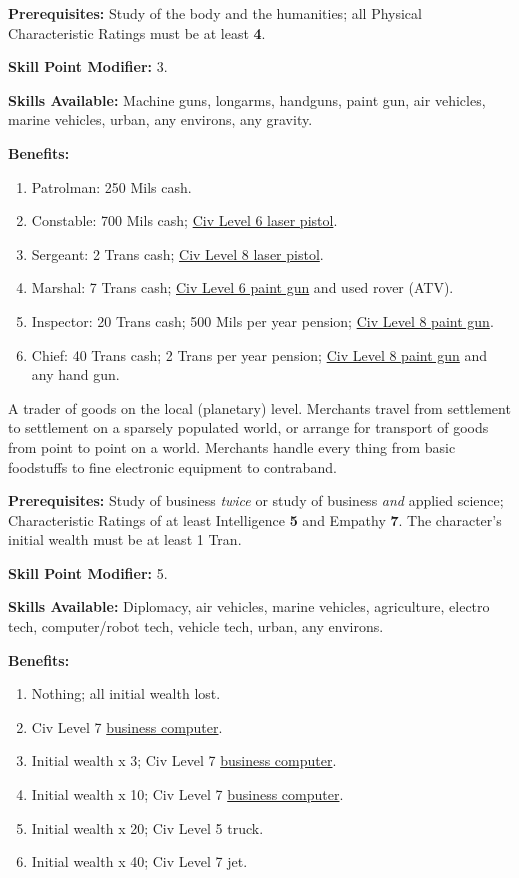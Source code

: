 \textbf{Prerequisites:} Study of the body and the humanities; all Physical Characteristic Ratings must be at least  \textbf{4}.

\textbf{Skill Point Modifier:} 3.

\textbf{Skills Available:} Machine guns, longarms, handguns, paint
gun, air vehicles, marine vehicles, urban, any environs, any gravity.

\pagebreak[2]
\textbf{Benefits:}   
\begin{enumerate}
\item  Patrolman: 250 Mils cash.  
\item Constable: 700 Mils cash; \hyperlink{tag:cl6-laser}{Civ Level 6 laser pistol}.  
\item Sergeant: 2 Trans cash; \hyperlink{tag:cl8-laser}{Civ Level 8 laser pistol}.   
\item Marshal: 7 Trans cash; \hyperlink{tag:cl6-paint}{Civ Level 6 paint gun} and used rover (ATV).  
\item Inspector: 20 Trans cash; 500 Mils per year pension; \hyperlink{tag:cl8-paint}{Civ Level 8
  paint gun}.
\item Chief: 40 Trans cash; 2 Trans per year pension; \hyperlink{tag:cl8-paint}{Civ Level 8
  paint gun} and any hand gun.
\end{enumerate}

\bigskip

\pagebreak[2]

\label{sec:prof-merchant}

A trader of goods on the local (planetary) level. Merchants travel
from settlement to settlement on a sparsely populated world, or
arrange for transport of goods from point to point on a world.
Merchants handle every thing from basic foodstuffs to fine electronic
equipment to contraband.

\textbf{Prerequisites:} Study of business \emph{twice} or study of
business \emph{and} applied science; Characteristic Ratings of at
least Intelligence \textbf{5} and Empathy \textbf{7}. The character's
initial wealth must be at least 1 Tran.

\textbf{Skill Point Modifier:} 5.

\textbf{Skills Available:} Diplomacy, air vehicles, marine vehicles,
agriculture, electro tech, computer/robot tech, vehicle tech, urban,
any environs.

\pagebreak[2]
\textbf{Benefits:}
\begin{enumerate}
\item Nothing; all initial wealth lost.  
\item Civ Level 7 \hyperlink{tag:buscomp}{business computer}.   
\item Initial wealth x 3; Civ Level 7 \hyperlink{tag:buscomp}{business computer}.  
\item Initial wealth x 10; Civ Level 7 \hyperlink{tag:buscomp}{business computer}.  
\item Initial wealth x 20; Civ Level 5 truck.   
\item Initial wealth x 40; Civ Level 7 jet.
\end{enumerate}

